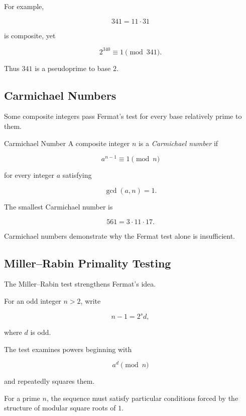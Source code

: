 For example,

\[ 341=11\cdot31 \]

is composite, yet

\[ 2^{340}\equiv1\pmod{341}. \]

Thus \(341\) is a pseudoprime to base \(2\).

\subsection{Carmichael Numbers}
\label{subsec:carmichael-numbers-computational}

Some composite integers pass Fermat's test for every base relatively prime to
them.

\begin{definitionbox}{Carmichael Number}
A composite integer \(n\) is a \emph{Carmichael number} if

\[ a^{n-1}\equiv1\pmod n \]

for every integer \(a\) satisfying

\[ \gcd(a,n)=1. \]
\end{definitionbox}

The smallest Carmichael number is

\[ 561=3\cdot11\cdot17. \]

Carmichael numbers demonstrate why the Fermat test alone is insufficient.

\subsection{Miller--Rabin Primality Testing}
\label{subsec:miller-rabin}

The Miller--Rabin test strengthens Fermat's idea.

For an odd integer \(n>2\), write

\[ n-1=2^sd, \]

where \(d\) is odd.

The test examines powers beginning with

\[ a^d\pmod n \]

and repeatedly squares them.

For a prime \(n\), the sequence must satisfy particular conditions forced by
the structure of modular square roots of \(1\).

